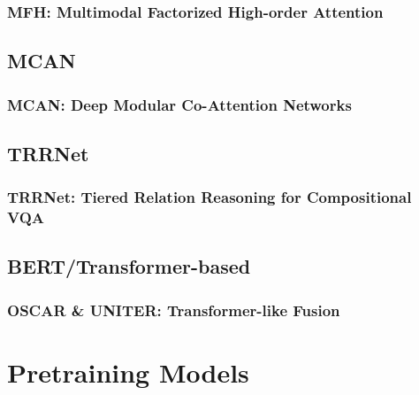 \documentclass{beamer}
\begin{document}
\begin{frame}
    \frametitle{MFH: Multimodal Factorized High-order Attention}

    

\end{frame}

\subsection{MCAN}

\begin{frame}
    \frametitle{MCAN: Deep Modular Co-Attention Networks}

    

\end{frame}

\subsection{TRRNet}

\begin{frame}
    \frametitle{TRRNet: Tiered Relation Reasoning for Compositional VQA}

    

\end{frame}

\subsection{BERT/Transformer-based}

\begin{frame}
    \frametitle{OSCAR \& UNITER: Transformer-like Fusion}

    

\end{frame}

\section{Pretraining Models}
\end{document}
